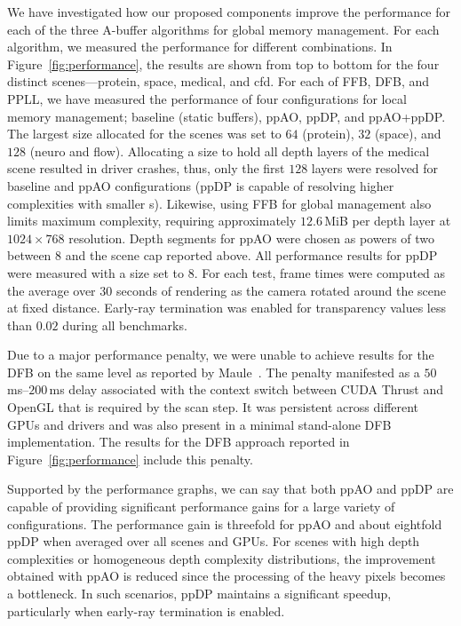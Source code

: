 \documentclass{egpubl}
\newcommand{\ab}{\mbox{A-buffer}}
\newcommand{\stencil}{ppAO}
\newcommand{\dloop}{ppDP}
\begin{document}
We have investigated how our proposed components improve the performance for each of the three \ab{} algorithms for global memory management. %
For each algorithm, we measured the performance for different combinations.
In Figure~\ref{fig:performance}, the results are shown from top to bottom for the four distinct scenes---protein, space, medical, and cfd.
For each of FFB, DFB, and PPLL, we have measured the performance of four configurations for local memory management; baseline (static buffers), \stencil{}, \dloop{}, and \stencil{}+\dloop{}. 
The largest \bArray{} size allocated for the scenes was set to $64$ (protein), $32$ (space), and $128$ (neuro and flow). 
Allocating a \bArray{} size to hold all depth layers of the medical scene resulted in driver crashes, thus, only the first $128$ layers were resolved for baseline and \stencil{} configurations (\dloop{} is capable of resolving higher complexities with smaller \bArray{}s). 
Likewise, using FFB for global management also limits maximum complexity, requiring approximately $12.6$\,MiB per depth layer at $1024 \times 768$ resolution. 
Depth segments for \stencil{} were chosen as powers of two between $8$ and the scene cap reported above. 
All performance results for \dloop{} were measured with a \bArray{} size set to $8$. 
For each test, frame times were computed as the average over $30$ seconds of rendering as the camera rotated around the scene at fixed distance. 
Early-ray termination was enabled for transparency values less than $0.02$ during all benchmarks.

Due to a major performance penalty, we were unable to achieve results for the DFB on the same level as reported by Maule~\cite{Maule2012}. 
The penalty manifested as a $50\,$ms--$200\,$ms delay associated with the context switch between CUDA Thrust and OpenGL that is required by the scan step.
It was persistent across different GPUs and drivers and was also present in a minimal stand-alone DFB implementation.
The results for the DFB approach reported in Figure~\ref{fig:performance} include this penalty.

Supported by the performance graphs, we can say that both \stencil{} and \dloop{} are capable of providing significant performance gains for a large variety of configurations. 
The performance gain is threefold for \stencil{} and about eightfold \dloop{} when averaged over all scenes and GPUs. %
For scenes with high depth complexities or homogeneous depth complexity distributions, the improvement obtained with \stencil{} is reduced since the processing of the heavy pixels becomes a bottleneck. 
In such scenarios, \dloop{} maintains a significant speedup, particularly when early-ray termination is enabled. 
\end{document}
